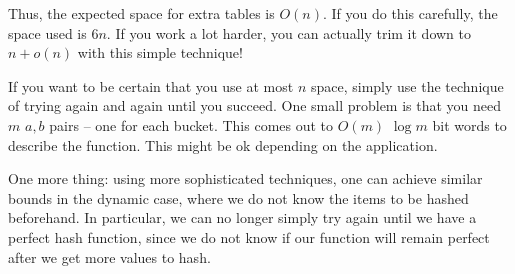 \documentclass{article}
\begin{document}
Thus, the expected space for extra tables is $O(n)$.  If you do this carefully, the space used is $6n$. If you work a lot harder, you can actually trim it down to $n + o(n)$ with this simple technique!

If you want to be certain that you use at most $n$ space, simply use the technique of trying again and again until you succeed.  One small problem is that you need $m$ $a,b$ pairs -- one for each bucket. This comes out to $O(m)$ $\log m$ bit words to describe the function.  This might be ok depending on the application.

One more thing: using more sophisticated techniques, one can achieve similar bounds in the dynamic case, where we do not know the items to be hashed beforehand. In particular, we can no longer simply try again until we have a perfect hash function, since we do not know if our function will remain perfect after we get more values to hash.
\end{document}
